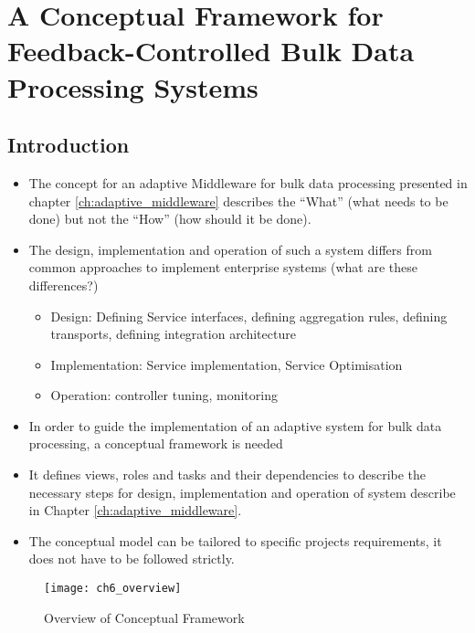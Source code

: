 

\chapter[Conceptual Framework]{A Conceptual Framework for Feedback-Controlled Bulk Data Processing Systems}\label{ch:conceptual_framework}


\section{Introduction} 

\begin{itemize}
	\item The concept for an adaptive Middleware for bulk data processing presented in chapter \ref{ch:adaptive_middleware} describes the ``What'' (what needs to be done) but not the ``How'' (how should it be done).
	\item The design, implementation and operation of such a system differs from common approaches to implement enterprise systems (what are these differences?)
	\begin{itemize}
		\item Design: Defining Service interfaces, defining aggregation rules, defining transports, defining integration architecture
		\item Implementation: Service implementation, Service Optimisation
		\item Operation: controller tuning, monitoring
	\end{itemize}
	\item In order to guide the implementation of an adaptive system for bulk data processing, a conceptual framework is needed
	\item It defines views, roles and tasks and their dependencies to describe the necessary steps for design, implementation and operation of system describe in Chapter \ref{ch:adaptive_middleware}.
	\item The conceptual model can be tailored to specific projects requirements, it does not have to be followed strictly.
\end{itemize}

\begin{figure}
	[htpb] \centering 
	\texttt{[image: ch6\_overview]} \caption{Overview of Conceptual Framework} \label{fig:ch6_overview} 
\end{figure}

